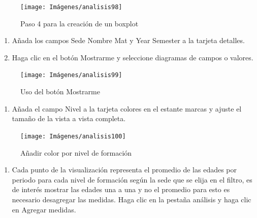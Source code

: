 \documentclass[
]{book}
\providecommand{\tightlist}{%
  \setlength{\itemsep}{0pt}\setlength{\parskip}{0pt}}
\begin{document}
\begin{figure}

{\centering \texttt{[image: Imágenes/analisis98]} 

}

\caption{Paso 4 para la creación de un boxplot}\label{fig:paso4boxplot-fig}
\end{figure}

\begin{enumerate}
\def\labelenumi{\arabic{enumi}.}
\setcounter{enumi}{4}
\item
  Añada los campos Sede Nombre Mat y Year Semester a la tarjeta detalles.
\item
  Haga clic en el botón Mostrarme y seleccione diagramas de campos o valores.
\end{enumerate}

\begin{figure}

{\centering \texttt{[image: Imágenes/analisis99]} 

}

\caption{Uso del botón Mostrarme}\label{fig:paso6boxplot-fig}
\end{figure}

\begin{enumerate}
\def\labelenumi{\arabic{enumi}.}
\setcounter{enumi}{6}
\tightlist
\item
  Añada el campo Nivel a la tarjeta colores en el estante marcas y ajuste el tamaño de la vista a vista completa.
\end{enumerate}

\begin{figure}

{\centering \texttt{[image: Imágenes/analisis100]} 

}

\caption{Añadir color por nivel de formación}\label{fig:paso7boxplot-fig}
\end{figure}

\begin{enumerate}
\def\labelenumi{\arabic{enumi}.}
\setcounter{enumi}{7}
\tightlist
\item
  Cada punto de la visualización representa el promedio de las edades por periodo para cada nivel de formación según la sede que se elija en el filtro, es de interés mostrar las edades una a una y no el promedio para esto es necesario desagregar las medidas. Haga clic en la pestaña análisis y haga clic en Agregar medidas.
\end{enumerate}
\end{document}
